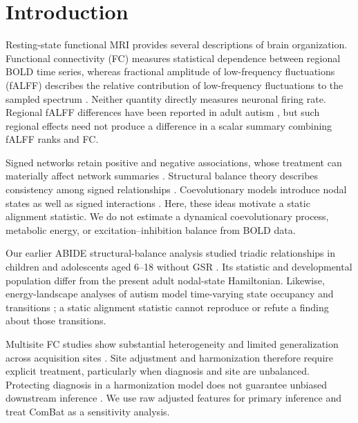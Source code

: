 \documentclass[10pt,letterpaper]{article}
\begin{document}
\clearpage
{}
\linenumbers

\section*{Introduction}
Resting-state functional MRI provides several descriptions of brain organization.
Functional connectivity (FC) measures statistical dependence between regional
BOLD time series, whereas fractional amplitude of low-frequency fluctuations
(fALFF) describes the relative contribution of low-frequency fluctuations to the
sampled spectrum \cite{Zou:2008fa}. Neither quantity directly measures neuronal
firing rate. Regional fALFF differences have been reported in adult autism
\cite{Itahashi2015revision}, but such regional effects need not produce a difference
in a scalar summary combining fALFF ranks and FC.

Signed networks retain positive and negative associations, whose treatment can
materially affect network summaries \cite{RubinovSporns2011}. Structural balance
theory describes consistency among signed relationships \cite{Heider:1946ac,cartwright1956}.
Coevolutionary models introduce nodal states as well as signed interactions
\cite{Kargaran:2021he,GhanbarzadehNoudehi2022}. Here, these ideas motivate a static
alignment statistic. We do not estimate a dynamical coevolutionary process,
metabolic energy, or excitation--inhibition balance from BOLD data.

Our earlier ABIDE structural-balance analysis studied triadic relationships in
children and adolescents aged 6--18 without GSR \cite{Moradimanesh2021}. Its
statistic and developmental population differ from the present adult nodal-state
Hamiltonian. Likewise, energy-landscape analyses of autism model time-varying
state occupancy and transitions \cite{Watanabe2017revision}; a static alignment
statistic cannot reproduce or refute a finding about those transitions.

Multisite FC studies show substantial heterogeneity and limited generalization
across acquisition sites \cite{King2019revision}. Site adjustment and harmonization
therefore require explicit treatment, particularly when diagnosis and site are
unbalanced. Protecting diagnosis in a harmonization model does not guarantee
unbiased downstream inference \cite{Nygaard2016revision}. We use raw adjusted
features for primary inference and treat ComBat as a sensitivity analysis.
\end{document}
